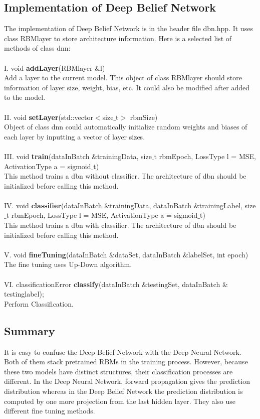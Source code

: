 \documentclass[12pt]{article}
\begin{document}
\subsection{Implementation of Deep Belief Network}
The implementation of Deep Belief Network is in the header file dbn.hpp. It uses class RBMlayer to store architecture information. Here is a selected list of methods of class dnn:\\
\\
I. void \textbf{addLayer}(RBMlayer $\&$l)\\
Add a layer to the current model. This object of class RBMlayer should store information of layer size, weight, bias, etc. It could also be modified after added to  the model.\\
\\
II. void \textbf{setLayer}(std::vector$<$size$\_$t$>$ rbmSize)\\
Object of class dnn could automatically initialize random weights and biases of each layer by inputting a vector of layer sizes.\\
\\
III. void \textbf{train}(dataInBatch $\&$trainingData, size$\_$t rbmEpoch, LossType l = MSE, ActivationType a = sigmoid$\_$t)\\
This method trains a dbn without classifier. The architecture of dbn should be initialized before calling this method. \\
\\
IV. void \textbf{classifier}(dataInBatch $\&$trainingData, dataInBatch $\&$trainingLabel, size$\_$t rbmEpoch, LossType l = MSE, ActivationType a = sigmoid$\_$t)\\
This method trains a dbn with classifier. The architecture of dbn should be initialized before calling this method.\\
\\
V. void \textbf{fineTuning}(dataInBatch $\&$dataSet, dataInBatch $\&$labelSet, int epoch)\\
The fine tuning uses Up-Down algorithm.\\
\\
VI. classificationError \textbf{classify}(dataInBatch $\&$testingSet, dataInBatch $\&$testinglabel);\\
Perform Classification.
\subsection{Summary}
It is easy to confuse the Deep Belief Network with the Deep Neural Network. Both of them stack pretrained RBMs in the training process. However, because these two models have distinct structures, their classification processes are different. In the Deep Neural Network, forward propagation gives the prediction distribution whereas in the Deep Belief Network the prediction distribution is computed by one more projection from the last hidden layer. They also use different fine tuning methods.
\clearpage
\end{document}
